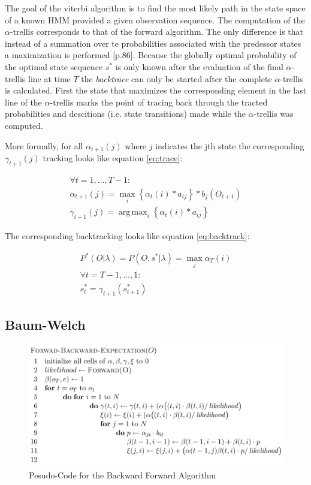 \documentclass[english, paper=a4]{scrartcl}
\DeclareMathOperator*{\argmax}{arg\,max}
\begin{document}
The goal of the viterbi algorithm is to find the most likely path in the state space of a known HMM provided a given observation sequence. The computation of the $\alpha$-trellis corresponds to that of the forward algorithm. The only difference is that instead of a summation over te probabilities associated with the predessor states a maximization is performed \cite{mm_pr}[p.86].
Because the globally optimal probability of the optimal state sequence $s^*$ is only known after the evaluation of the final $\alpha$-trellis line at time $T$ the \emph{backtrace} can only be started after the complete $\alpha$-trellis is calculated.
First the state that maximizes the corresponding element in the last line of the $\alpha$-trellis marks the point of tracing back through the tracted probabilities and descitions (i.e. state transitions) made while the $\alpha$-trellis was computed.

More formally, for all $\alpha_{t+1}(j)$ where $j$ indicates the jth state the corresponding $\gamma_{t+1}(j)$ tracking looks like equation \eqref{eq:trace}:

\begin{eqnarray}
	\forall t = 1, \ldots, T-1: \\
	\alpha_{t+1}(j) = \max_i \left\{ \alpha_{t}(i)*a_{ij} \right\} *b_j(O_{t+1})  \\
	\gamma_{t+1}(j) = \argmax_{i} \left\{ \alpha_{t}(i)*a_{ij} \right\}
	\label{eq:trace} 
\end{eqnarray}  

The corresponding backtracking looks like equation \eqref{eq:backtrack}:

\begin{eqnarray}
	P^*(O | \lambda) = P(O, s^* | \lambda) = \max_j \alpha_T(i) \\
	\forall t = T-1, \ldots, 1: \\
	s^*_t = \gamma_{t+1}(s^*_{t+1})
	\label{eq:backtrack} 
\end{eqnarray}

\subsection{Baum-Welch}


\begin{figure}[H]

\centering
\includegraphics[scale=0.4]{"BW"}
 \caption{Pesudo-Code for the Backward Forward Algorithm \cite{cuhmm}}

\end{figure}
\end{document}
